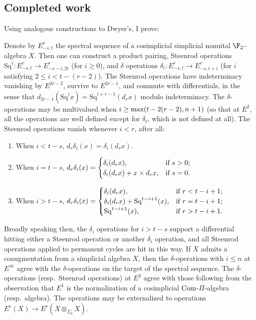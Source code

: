 \documentclass[11pt]{article}
\newcommand{\Sq}{\mathrm{Sq}}
\begin{document}
\subsection{Completed work}
Using analogous constructions to Dwyer's, I prove:
\begin{thm}\label{adamsOperationsOmnibus}
Denote by $E^r_{-s,t}$ the spectral sequence of a cosimplicial simplicial nonuital $\F_2$-algebra $X$. Then one can construct a product pairing, Steenrod operations $\Sq^i:E^r_{-s,t}\to E^r_{-s-i,2t}$ (for $i\geq0$), and $\delta$ operations $\delta_i:E^r_{-s,t}\to E^r_{-s,t+i}$ (for $i$ satisfying $2\leq i<t-(r-2)$). The Steenrod operations have indeterminacy vanishing by $E^{2r-2}$, survive to $E^{2r-1}$, and commute with differentials, in the sense that $d_{2r-1}(\Sq^ix)=\Sq^{i+r-1}(d_rx)$ modulo indeterminacy. The $\delta$-operations may be multivalued when $i\geq \textup{max}(t-2(r-2),n+1)$ (so that at $E^2$, all the operations are well defined except for $\delta_t$, which is not defined at all). The Steenrod operations vanish whenever $i<r$, after all:
\begin{enumerate}\squishlist
\setlength{\parindent}{.25in}
\item When $i<t-s$, $d_r\delta_i(x)=\delta_i(d_rx)$.
\item When $i=t-s$, $d_r\delta_i(x)=\begin{cases}
\delta_i(d_rx),&\textup{if }s>0;\\
\delta_i(d_rx)+x\times d_rx,&\textup{if }s=0.
\end{cases}$
\item When $i>t-s$, $d_r\delta_i(x)=\begin{cases}
\delta_i(d_rx),&\textup{if }r<t-i+1;\\
\delta_i(d_rx)+\Sq^{t-i+1}(x),&\textup{if }r=t-i+1;\\
\Sq^{t-i+1}(x),&\textup{if }r>t-i+1.\\
\end{cases}$
\end{enumerate}
Broadly speaking then, the $\delta_i$ operations for $i>t-s$ support a differential hitting either a Steenrod operation or another $\delta_i$ operation, and all Steenrod operations applied to permanent cycles are hit in this way. If $X$ admits a coaugmentation from a simplicial algebra $X$, then the $\delta$-operations with $i\leq n$ at $E^\infty$ agree with the $\delta$-operations on the target of the spectral sequence. The $\delta$-operations (resp.\ Steenrod operations)  at $E^2$ agree with those following from the observation that $E^1$ is the normalization of a cosimplicial $\textup{Com}$-$\Pi$-algebra (resp.\ algebra). The operations may be externalized to operations $E^r(X)\to E^r(X\otimes_{\Sigma_2} X)$.
\end{thm}
\end{document}
